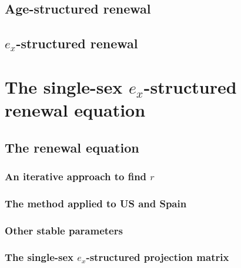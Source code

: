     \section{Age-structured renewal}
      
    
    \section{$e_x$-structured renewal}
      
    
\chapter{The single-sex $e_x$-structured renewal equation}
    
    \section{The renewal equation}
      
      
      \subsection{An iterative approach to find $r$}
        
    
      \subsection{The method applied to US and Spain}
        
        
      \subsection{Other stable parameters}
        
      
      \subsection{The single-sex $e_x$-structured projection matrix}
        

